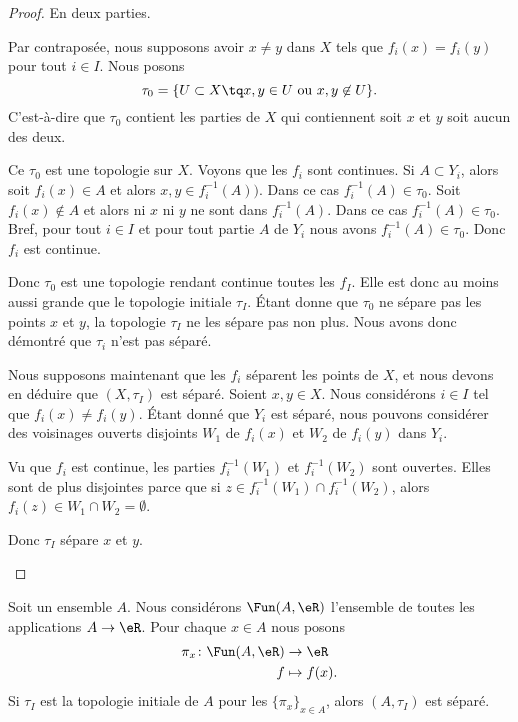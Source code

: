 \begin{proof}
	En deux parties.
	\begin{subproof}
		\spitem[\( \Rightarrow\)]
		Par contraposée, nous supposons avoir \( x\neq y\) dans \( X\) tels que \( f_i(x)=f_i(y)\) pour tout \( i\in I\). Nous posons
		\begin{equation}
			\tau_0=\{ U\subset X\tq x,y\in U\text{ ou }x,y\not\in U \}.
		\end{equation}
		C'est-à-dire que \( \tau_0\) contient les parties de \( X\) qui contiennent soit \( x\) et \( y\) soit aucun des deux.

		Ce \( \tau_0\) est une topologie sur \( X\). Voyons que les \( f_i\) sont continues. Si \( A\subset Y_i\), alors soit \( f_i(x)\in A\) et alors \( x,y\in f_i^{-1}(A))\). Dans ce cas \( f_i^{-1}(A)\in \tau_0\). Soit \( f_i(x)\not\in A\) et alors ni \( x\) ni \( y\) ne sont dans \( f_i^{-1}(A)\). Dans ce cas \( f_i^{-1}(A)\in \tau_0\). Bref, pour tout \( i\in I\) et pour tout partie \( A\) de \( Y_i\) nous avons \( f_i^{-1}(A)\in \tau_0\). Donc \( f_i\) est continue.

		Donc \( \tau_0\) est une topologie rendant continue toutes les \( f_I\). Elle est donc au moins aussi grande que le topologie initiale \( \tau_I\). Étant donne que \( \tau_0\) ne sépare pas les points \( x\) et \( y\), la topologie \( \tau_I\) ne les sépare pas non plus. Nous avons donc démontré que \( \tau_i\) n'est pas séparé.

		\spitem[\( \Leftarrow\)]
		Nous supposons maintenant que les \( f_i\) séparent les points de \( X\), et nous devons en déduire que \( (X,\tau_I)\) est séparé. Soient \( x,y\in X\). Nous considérons \( i\in I\) tel que \( f_i(x)\neq f_i(y)\). Étant donné que \( Y_i\) est séparé, nous pouvons considérer des voisinages ouverts disjoints \( W_1\) de \( f_i(x)\) et \( W_2\) de \( f_i(y)\) dans \( Y_i\).

		Vu que \( f_i\) est continue, les parties \( f_i^{-1}(W_1)\) et \( f_i^{-1}(W_2)\) sont ouvertes. Elles sont de plus disjointes parce que si \( z\in f_i^{-1}(W_1)\cap f_i^{-1}(W_2)\), alors \( f_i(z)\in W_1\cap W_2=\emptyset\).

		Donc \( \tau_I\) sépare \( x\) et \( y\).
	\end{subproof}
\end{proof}

\begin{lemma}	\label{LEMooZLZKooHElBOs}
	Soit un ensemble \( A\). Nous considérons \( \Fun(A,\eR)\) l'ensemble de toutes les applications \( A\to \eR\). Pour chaque \( x\in A\) nous posons
	\begin{equation}
		\begin{aligned}
			\pi_x\colon \Fun(A,\eR) & \to \eR       \\
			f                       & \mapsto f(x).
		\end{aligned}
	\end{equation}
	Si \( \tau_I\) est la topologie initiale de \( A\) pour les \( \{ \pi_x \}_{x\in A}\), alors \( (A,\tau_I)\) est séparé.
\end{lemma}

